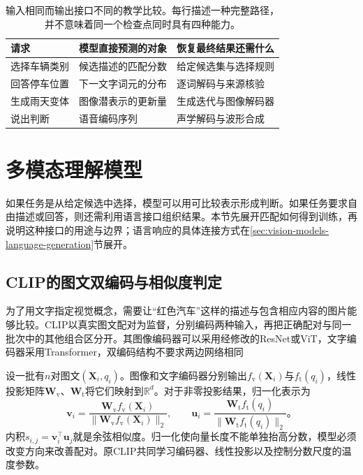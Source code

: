 \begin{table}[htbp]
  \centering
  \small
  \begin{tabularx}{\linewidth}{@{}p{22mm}XX@{}}
    \toprule
    请求 & 模型直接预测的对象 & 恢复最终结果还需什么\\
    \midrule
    选择车辆类别 & 候选描述的匹配分数 & 给定候选集与选择规则\\
    回答停车位置 & 下一文字词元的分布 & 逐词解码与来源核验\\
    生成雨天变体 & 图像潜表示的更新量 & 生成迭代与图像解码器\\
    说出判断 & 语音编码序列 & 声学解码与波形合成\\
    \bottomrule
  \end{tabularx}
  \caption{输入相同而输出接口不同的教学比较。每行描述一种完整路径，并不意味着同一个检查点同时具有四种能力。}
  \label{tab:vision-model-interfaces}
\end{table}
\FloatBarrier

\section{多模态理解模型}
\label{sec:vision-models-understanding}

如果任务是从给定候选中选择，模型可以用可比较表示形成判断。如果任务要求自由描述或回答，则还需利用语言接口组织结果。本节先展开匹配如何得到训练，再说明这种接口的用途与边界；语言响应的具体连接方式在\ref{sec:vision-models-language-generation}节展开。

\subsection{CLIP的图文双编码与相似度判定}
\label{sec:vision-models-contrastive}

为了用文字指定视觉概念，需要让“红色汽车”这样的描述与包含相应内容的图片能够比较。CLIP以真实图文配对为监督，分别编码两种输入，再把正确配对与同一批次中的其他组合区分开。其图像编码器可以采用经修改的ResNet或ViT，文字编码器采用Transformer，双编码结构不要求两边网络相同

设一批有$n$对图文$(\bm{X}_i,q_i)$。图像和文字编码器分别输出$f_{\mathrm v}(\bm{X}_i)$与$f_{\mathrm t}(q_i)$，线性投影矩阵$\bm{W}_{\mathrm v}$、$\bm{W}_{\mathrm t}$将它们映射到$\mathbb{R}^d$。对于非零投影结果，归一化表示为
\begin{equation}
  \bm{v}_i=\frac{\bm{W}_{\mathrm v}f_{\mathrm v}(\bm{X}_i)}
                    {\lVert\bm{W}_{\mathrm v}f_{\mathrm v}(\bm{X}_i)\rVert_2},
  \qquad
  \bm{u}_i=\frac{\bm{W}_{\mathrm t}f_{\mathrm t}(q_i)}
                    {\lVert\bm{W}_{\mathrm t}f_{\mathrm t}(q_i)\rVert_2}\text{。}
  \label{eq:vision-clip-embedding}
\end{equation}
内积$s_{i,j}=\bm{v}_i^\top\bm{u}_j$就是余弦相似度。归一化使向量长度不能单独抬高分数，模型必须改变方向来改善配对。原CLIP共同学习编码器、线性投影以及控制分数尺度的温度参数。

